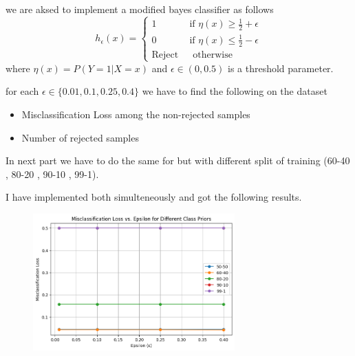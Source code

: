 \documentclass{article}
\begin{document}
\begin{itemize}
    we are aksed to implement a modified bayes classifier as follows
    \[
    h_{\epsilon}(x) = \begin{cases}
        1 \hspace{37pt} \text{ if } \eta(x) \geq \frac{1}{2} + \epsilon \\
        0 \hspace{37pt} \text{ if } \eta(x) \leq \frac{1}{2} - \epsilon \\
        \text{Reject} \hspace{14pt} \text{ otherwise}
    \end{cases}
    \]
    where $\eta(x) = P(Y=1|X=x)$ and $\epsilon \in (0,0.5) $ is a threshold parameter. 

    for each $\epsilon \in \{0.01,0.1,0.25,0.4\}$ we have to find the following on the dataset
    \begin{itemize}
        \item Misclassification Loss among the non-rejected samples
        \item Number of rejected samples  
    \end{itemize}

    In next part we have to do the same for but with different split of training (60-40 , 80-20 , 90-10 , 99-1).

    

    I have implemented both simulteneously and got the following results.
    \begin{figure}[h]
        \centering
        \includegraphics[width=0.69\textwidth]{Misclassification.png} %
        \label{fig:Bayes}
    \end{figure}


\end{itemize}
\end{document}

